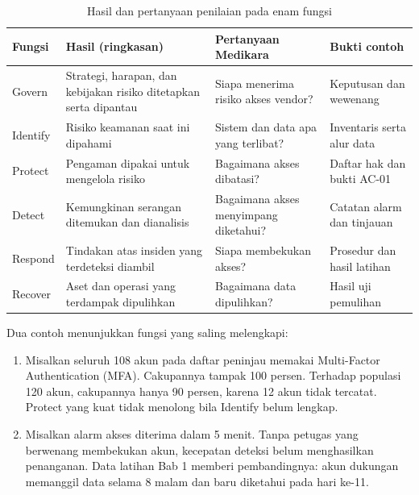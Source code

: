 \begin{table}[!htb]
  \centering\small
  \caption{Hasil dan pertanyaan penilaian pada enam fungsi}\label{tab:ch06-fungsi}
  \begin{tabularx}{\textwidth}{|>{\raggedright\arraybackslash}p{}|>{\raggedright\arraybackslash}X|>{\raggedright\arraybackslash}X|>{\raggedright\arraybackslash}p{}|}
    \hline
    \textbf{Fungsi} & \textbf{Hasil (ringkasan)} & \textbf{Pertanyaan Medikara} & \textbf{Bukti contoh}
    \\ \hline
    Govern & Strategi, harapan, dan kebijakan risiko ditetapkan serta dipantau & Siapa menerima
    risiko akses vendor? & Keputusan dan wewenang \\ \hline
    Identify & Risiko keamanan saat ini dipahami & Sistem dan data apa yang terlibat? & Inventaris
    serta alur data \\ \hline
    Protect & Pengaman dipakai untuk mengelola risiko & Bagaimana akses dibatasi? & Daftar hak dan
    bukti AC-01 \\ \hline
    Detect & Kemungkinan serangan ditemukan dan dianalisis & Bagaimana akses menyimpang diketahui? &
    Catatan alarm dan tinjauan \\ \hline
    Respond & Tindakan atas insiden yang terdeteksi diambil & Siapa membekukan akses? & Prosedur dan
    hasil latihan \\ \hline
    Recover & Aset dan operasi yang terdampak dipulihkan & Bagaimana data dipulihkan? & Hasil uji
    pemulihan \\ \hline
  \end{tabularx}
\end{table}

Dua contoh menunjukkan fungsi yang saling melengkapi:
\begin{enumerate}
  \item Misalkan seluruh 108 akun pada daftar peninjau memakai Multi-Factor Authentication (MFA).
  Cakupannya tampak 100 persen. Terhadap populasi 120 akun, cakupannya hanya 90 persen, karena 12
  akun tidak tercatat. Protect yang kuat tidak menolong bila Identify belum lengkap.
  \item Misalkan alarm akses diterima dalam 5 menit. Tanpa petugas yang berwenang membekukan akun,
  kecepatan deteksi belum menghasilkan penanganan. Data latihan Bab 1 memberi pembandingnya: akun
  dukungan memanggil data selama 8 malam dan baru diketahui pada hari ke-11.
\end{enumerate}

